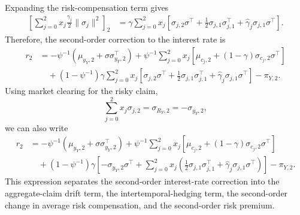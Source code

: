 Expanding the risk-compensation term gives
\begin{align}
    \left[\sum_{j=0}^2 x_j\frac{\gamma_j}{2}\|\sigma_j\|^2\right]_2
    &= \gamma \sum_{j=0}^2 x_j \left[
        \sigma_{j,2}\sigma^\top
        + \frac{1}{2}\sigma_{j,1}\sigma_{j,1}^\top
        + \hat{\gamma}_j \sigma_{j,1}\sigma^\top
    \right].
\end{align}
Therefore, the second-order correction to the interest rate is
\begin{align}\label{eq:r2-second-order}
    r_2
    &= -\psi^{-1}\left(\mu_{y_Y,2}+\sigma\sigma_{y_Y,2}^\top\right)
    + \psi^{-1}\sum_{j=0}^2 x_j\left[\mu_{c_j,2} + (1-\gamma)\sigma_{c_j,2}\sigma^\top\right] \nonumber\\
    &\quad + (1-\psi^{-1})\gamma \sum_{j=0}^2 x_j \left[
        \sigma_{j,2}\sigma^\top
        + \frac{1}{2}\sigma_{j,1}\sigma_{j,1}^\top
        + \hat{\gamma}_j \sigma_{j,1}\sigma^\top
    \right]
    - \pi_{Y,2}.
\end{align}
Using market clearing for the risky claim,
\begin{equation}
    \sum_{j=0}^2 x_j \sigma_{j,2}=\sigma_{R_Y,2}=-\sigma_{y_Y,2},
\end{equation}
we can also write
\begin{align}\label{eq:r2-second-order-simplified}
    r_2
    &= -\psi^{-1}\left(\mu_{y_Y,2}+\sigma\sigma_{y_Y,2}^\top\right)
    + \psi^{-1}\sum_{j=0}^2 x_j\left[\mu_{c_j,2} + (1-\gamma)\sigma_{c_j,2}\sigma^\top\right] \nonumber\\
    &\quad + (1-\psi^{-1})\gamma \left[-\sigma_{y_Y,2}\sigma^\top
        + \sum_{j=0}^2 x_j \left(
        \frac{1}{2}\sigma_{j,1}\sigma_{j,1}^\top
        + \hat{\gamma}_j \sigma_{j,1}\sigma^\top
    \right)\right]
    - \pi_{Y,2}.
\end{align}
This expression separates the second-order interest-rate correction into the aggregate-claim drift term, the intertemporal-hedging term, the second-order change in average risk compensation, and the second-order risk premium.


